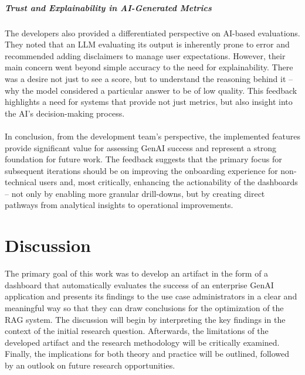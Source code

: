 \documentclass[
	english,
	ruledheaders=section,%
	class=report,%
	thesis={type=bachelor},%
	accentcolor=1b,%
	custommargins=true,%
	marginpar=false,%
	parskip=half-,%
	fontsize=11pt,%
	DIV=14,
]{tudapub}
\begin{document}
\paragraph{Trust and Explainability in AI-Generated Metrics} The developers also provided a differentiated perspective on AI-based evaluations. They noted that an LLM evaluating its output is inherently prone to error and recommended adding disclaimers to manage user expectations. However, their main concern went beyond simple accuracy to the need for explainability. There was a desire not just to see a score, but to understand the reasoning behind it -- why the model considered a particular answer to be of low quality. This feedback highlights a need for systems that provide not just metrics, but also insight into the AI's decision-making process.\\
\\
In conclusion, from the development team's perspective, the implemented features provide significant value for assessing GenAI success and represent a strong foundation for future work. The feedback suggests that the primary focus for subsequent iterations should be on improving the onboarding experience for non-technical users and, most critically, enhancing the actionability of the dashboards -- not only by enabling more granular drill-downs, but by creating direct pathways from analytical insights to operational improvements.

\chapter{Discussion}
The primary goal of this work was to develop an artifact in the form of a dashboard that automatically evaluates the success of an enterprise GenAI application and presents its findings to the use case administrators in a clear and meaningful way so that they can draw conclusions for the optimization of the RAG system. The discussion will begin by interpreting the key findings in the context of the initial research question. Afterwards, the limitations of the developed artifact and the research methodology will be critically examined. Finally, the implications for both theory and practice will be outlined, followed by an outlook on future research opportunities.
\end{document}
